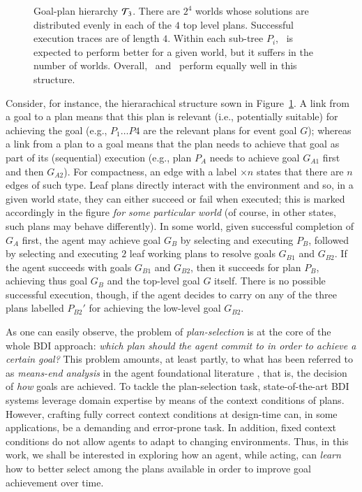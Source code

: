 \begin{figure}[t]
\begin{center}

\end{center}
\caption{Goal-plan hierarchy ${\mathcal{T}}_3$. There are $2^4$ worlds whose solutions are
distributed evenly in each of the $4$ top level plans. Successful execution
traces are of length $4$. Within each sub-tree $P_i$, \BUL\ is expected to
perform better for a given world, but it suffers in the number of worlds. Overall, \CL\ and \BUL\
perform equally well in this structure.}
\label{fig:T3}
\end{figure}


Consider, for instance, the hierarachical structure sown in Figure~\ref{fig:T3}.
A link from a goal to a plan means that this plan is relevant (i.e., potentially
suitable) for achieving the goal (e.g., $P_1 \ldots P4$ are the relevant plans
for event goal $G$); whereas a link from a plan to a goal means that the plan
needs to achieve that goal as part of its (sequential) execution (e.g., plan
$P_A$ needs to achieve goal $G_{A1}$ first and then $G_{A2}$).
For compactness, an edge with a label $\times n$ states that there are $n$ edges
of such type.
Leaf plans directly interact with the environment and so, in a given world state,
they can either succeed or fail when executed; this is marked accordingly in the
figure \emph{for some particular world} (of course, in other states, such plans
may behave differently).
In some world, given successful completion of $G_A$ first, the agent may achieve
goal $G_B$ by selecting and executing $P_B$, followed by selecting and executing
$2$ leaf working plans to resolve goals $G_{B1}$ and $G_{B2}$. If the agent
succeeds with goals $G_{B1}$ and $G_{B2}$, then it succeeds for plan $P_B$,
achieving thus goal $G_B$ and the top-level goal $G$ itself. There is no possible
successful execution, though, if the agent decides to carry on any of the three
plans labelled $P_{B2}'$ for achieving the low-level goal $G_{B2}$.





As one can easily observe, the problem of \textit{plan-selection} is at the core
of the whole BDI approach:
\emph{which plan should the agent commit to in order to achieve a certain goal?}
This problem amounts, at least partly, to what has been referred to as
\emph{means-end analysis} in the agent foundational literature
\cite{Pollack92-IRMA,Bratman88}, that is, the decision of \textit{how} goals are
achieved.
To tackle the plan-selection task, state-of-the-art BDI systems leverage domain
expertise by means of the context conditions of plans. However, crafting fully
correct context conditions at design-time can, in some applications, be a
demanding and error-prone task. In addition, fixed context conditions do not
allow agents to adapt to changing environments.
Thus, in this work, we shall be interested in
exploring how an agent, while acting, can \emph{learn} how to better
select among the
plans available in order to improve goal achievement over time.




